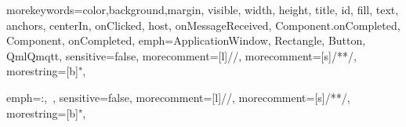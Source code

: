 \makeatletter
{}
\makeatother

\setcounter{secnumdepth}{3}
\setcounter{tocdepth}{3}


{morekeywords={color,background,margin, visible, width, height, title, id, fill, text, anchors, centerIn, onClicked, host, onMessageReceived, Component.onCompleted, Component, onCompleted}, 
	emph={ApplicationWindow, Rectangle, Button, QmlQmqtt},
	sensitive=false, 
	morecomment=[l]{//}, 
	morecomment=[s]{/*}{*/},
	morestring=[b]", 
} 


{
	emph={:, \,},
	sensitive=false, 
	morecomment=[l]{//}, 
	morecomment=[s]{/*}{*/},
	morestring=[b]", 
} 

\newcommand{\specialcell}[2][c]{%
	\begin{tabular}[#1]{@{}c@{}}#2\end{tabular}}
